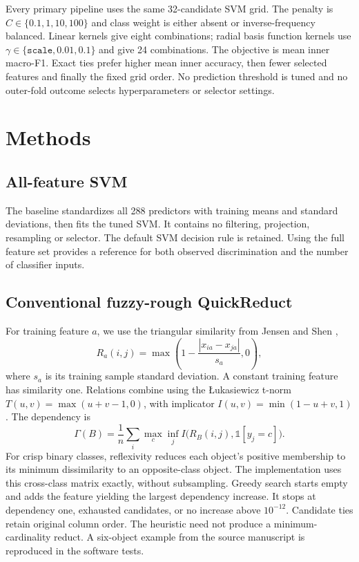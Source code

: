 \documentclass[11pt,a4paper]{article}
\begin{document}
Every primary pipeline uses the same 32-candidate SVM grid. The penalty is $C\in\{0.1,1,10,100\}$ and class weight is either absent or inverse-frequency balanced. Linear kernels give eight combinations; radial basis function kernels use $\gamma\in\{\texttt{scale},0.01,0.1\}$ and give 24 combinations. The objective is mean inner macro-F1. Exact ties prefer higher mean inner accuracy, then fewer selected features and finally the fixed grid order. No prediction threshold is tuned and no outer-fold outcome selects hyperparameters or selector settings.

\section{Methods}
\subsection{All-feature SVM}
The baseline standardizes all 288 predictors with training means and standard deviations, then fits the tuned SVM. It contains no filtering, projection, resampling or selector. The default SVM decision rule is retained. Using the full feature set provides a reference for both observed discrimination and the number of classifier inputs.

\subsection{Conventional fuzzy-rough QuickReduct}
For training feature $a$, we use the triangular similarity from Jensen and Shen \cite{jensen},
\begin{equation}
 R_a(i,j)=\max\left(1-\frac{|x_{ia}-x_{ja}|}{s_a},0\right),
\end{equation}
where $s_a$ is its training sample standard deviation. A constant training feature has similarity one. Relations combine using the \L{}ukasiewicz t-norm $T(u,v)=\max(u+v-1,0)$, with implicator $I(u,v)=\min(1-u+v,1)$. The dependency is
\begin{equation}
 \Gamma(B)=\frac{1}{n}\sum_i\max_c\inf_j I\bigl(R_B(i,j),\mathbb{1}[y_j=c]\bigr).
\end{equation}
For crisp binary classes, reflexivity reduces each object's positive membership to its minimum dissimilarity to an opposite-class object. The implementation uses this cross-class matrix exactly, without subsampling. Greedy search starts empty and adds the feature yielding the largest dependency increase. It stops at dependency one, exhausted candidates, or no increase above $10^{-12}$. Candidate ties retain original column order. The heuristic need not produce a minimum-cardinality reduct. A six-object example from the source manuscript is reproduced in the software tests.
\end{document}
